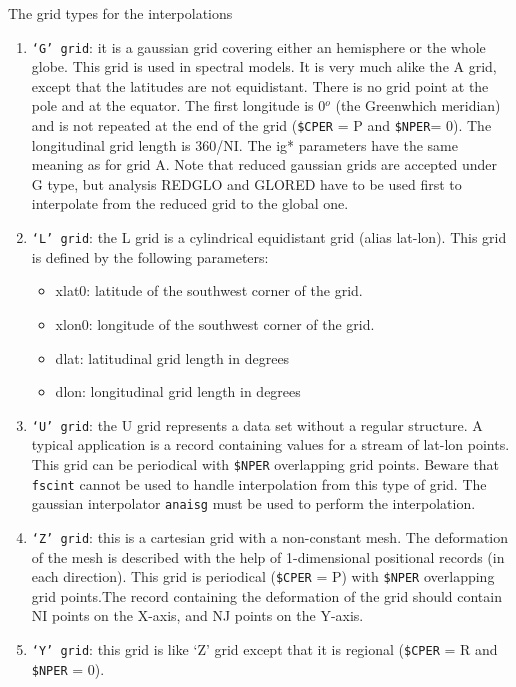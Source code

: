\begin{section}{The grid types for the interpolations}
\begin{enumerate}
  
\item {\tt `G' grid}: it is a gaussian grid covering either an
      hemisphere or the whole globe. This grid is used in spectral
      models. It is very much alike the A grid, except that the
      latitudes are not equidistant. There is no grid point at the
      pole and at the equator. The first longitude is 0$^o$ (the
      Greenwhich meridian) and is not repeated at the end of the
      grid ({\tt \$CPER} = P and {\tt \$NPER}= 0). 
      The longitudinal grid length is 360/NI. 
      The ig* parameters
      have the same meaning as for grid A. Note that reduced gaussian
      grids are accepted under G type, but analysis REDGLO and GLORED
      have to be used first to interpolate from the reduced grid to the
      global one.


\item {\tt `L' grid}: the L grid is a cylindrical equidistant grid
      (alias lat-lon). This grid is defined by the following
      parameters: 

  \begin{itemize}
    \item xlat0: latitude of the southwest corner of the grid.
    \item xlon0: longitude of the southwest corner of the grid.
    \item dlat: latitudinal grid length in degrees
    \item dlon: longitudinal grid length in degrees
 \end{itemize}

\item {\tt `U' grid}: the U grid represents a data set without a
      regular structure. A typical application is a record containing
      values for a stream of lat-lon points. This grid can be periodical
      with {\tt \$NPER} overlapping grid points. Beware that {\tt fscint}
      cannot be used to handle interpolation from this type of grid. The
      gaussian interpolator {\tt anaisg} must be used to perform the
      interpolation.

\item {\tt `Z' grid}: this is a cartesian grid with a non-constant
      mesh. The deformation of the mesh is described with the help of
      1-dimensional positional records (in each direction). This grid is
      periodical ({\tt \$CPER} = P)
      with {\tt \$NPER} overlapping grid points.The record
      containing the deformation of the grid should contain NI points
      on the X-axis, and NJ points on the Y-axis. 

\item {\tt `Y' grid}: this grid is like `Z' grid except that it is 
      regional ({\tt \$CPER} = R and {\tt \$NPER} = 0).
\end{enumerate}

\end{section}